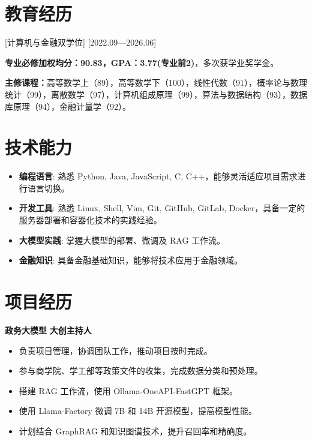 \documentclass{resume}
\begin{document}

\ResumeTitle

\section{教育经历}
[\textnormal{计算机与金融双学位}]
[2022.09—2026.06]

\textbf{专业必修加权均分：90.83，GPA：3.77(专业前2)}，多次获学业奖学金。

\textbf{主修课程：}高等数学上（89），高等数学下（100），线性代数（91），概率论与数理统计（99），离散数学（97），计算机组成原理（99），算法与数据结构（93），数据库原理（94），金融计量学（92）。

\section{技术能力}
\begin{itemize}
    \item \textbf{编程语言}: 熟悉 Python, Java, JavaScript, C, C++，能够灵活适应项目需求进行语言切换。
    \item \textbf{开发工具}: 熟悉 Linux, Shell, Vim, Git, GitHub, GitLab, Docker，具备一定的服务器部署和容器化技术的实践经验。
    \item \textbf{大模型实践}: 掌握大模型的部署、微调及 RAG 工作流。
    \item \textbf{金融知识}: 具备金融基础知识，能够将技术应用于金融领域。
\end{itemize}

\section{项目经历}

\textbf{政务大模型} \hfill \textbf{大创主持人}
\begin{itemize}
    \item 负责项目管理，协调团队工作，推动项目按时完成。
    \item 参与商学院、学工部等政策文件的收集，完成数据分类和预处理。
    \item 搭建 RAG 工作流，使用 Ollama-OneAPI-FastGPT 框架。
    \item 使用 Llama-Factory 微调 7B 和 14B 开源模型，提高模型性能。
    \item 计划结合 GraphRAG 和知识图谱技术，提升召回率和精确度。
\end{itemize}
\end{document}
